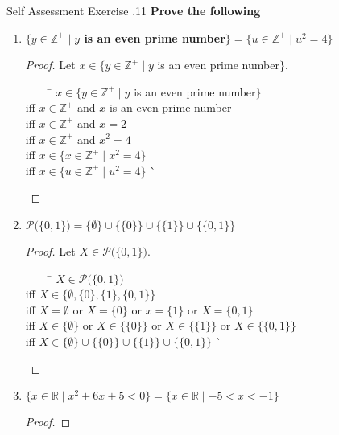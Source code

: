 \documentclass[../notes.tex]{subfiles}
\begin{document}
			\pagebreak
			\begin{exercise}{Self Assessment Exercise \thechapter.11}
				\textbf{Prove the following}
				\begin{enumerate}
					\item \textbf{$\{y \in \mathbb{Z}^{+} \mid y$ is an even prime number$\} = \{u \in \mathbb{Z}^{+} \mid u^{2} = 4\}$}
						\begin{proof}
							Let $x \in \{y \in \mathbb{Z}^{+} \mid y$ is an even prime number$\}$.
							\begin{tabbing}
								$\qquad$ \= $x \in \{y \in \mathbb{Z}^{+} \mid y$ is an even prime number$\}$\\
								iff      \> $x \in \mathbb{Z}^{+}$ and $x$ is an even prime number\\
								iff      \> $x \in \mathbb{Z}^{+}$ and $x = 2$\\
								iff      \> $x \in \mathbb{Z}^{+}$ and $x^{2} = 4$\\
								iff      \> $x \in \{x \in \mathbb{Z}^{+} \mid x^{2} = 4\}$\\
								iff      \> $x \in \{u \in \mathbb{Z}^{+} \mid u^{2} = 4\}$ \` \qedhere
							\end{tabbing}
						\end{proof}
					\item \textbf{$\mathcal{P}\bigl(\{0, 1\}\bigr) = \{\emptyset\} \cup \bigl\{\{0\}\bigr\} \cup \bigl\{\{1\}\bigr\} \cup \bigl\{\{0, 1\}\bigr\}$}
						\begin{proof}
							Let $X \in \mathcal{P}\bigl(\{0, 1\}\bigr)$.
							\begin{tabbing}
								$\qquad$ \= $X \in \mathcal{P}\bigl(\{0, 1\}\bigr)$\\
								iff \> $X \in \bigl\{\emptyset, \{0\}, \{1\}, \{0, 1\}\bigr\}$\\
								iff \> $X = \emptyset$ or $X = \{0\}$ or $x = \{1\}$ or $X = \{0, 1\}$\\
								iff \> $X \in \{\emptyset\}$ or $X \in \bigl\{\{0\}\bigr\}$ or $X \in \bigl\{\{1\}\bigr\}$ or $X \in \bigl\{\{0, 1\}\bigr\}$\\
								iff \> $X \in \{\emptyset\} \cup \bigl\{\{0\}\bigr\} \cup \bigl\{\{1\}\bigr\} \cup \bigl\{\{0, 1\}\bigr\}$ \` \qedhere
							\end{tabbing}
						\end{proof}
					\item \textbf{$\{x \in \mathbb{R} \mid x^{2} + 6x + 5 < 0\} = \{x \in \mathbb{R} \mid -5 < x < -1\}$}
						\begin{proof}

\end{proof}
\end{enumerate}
\end{exercise}
\end{document}
